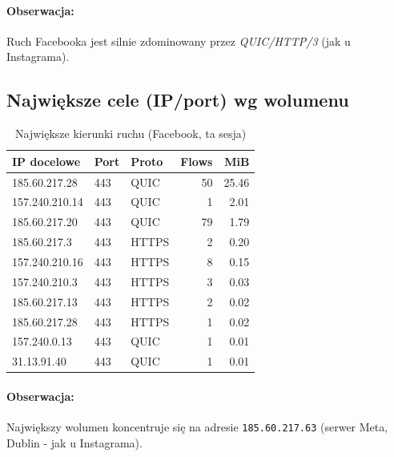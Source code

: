 \paragraph{Obserwacja:} 
Ruch Facebooka jest silnie zdominowany przez \emph{QUIC/HTTP/3} (jak u Instagrama). 

\subsection{Największe cele (IP/port) wg wolumenu}
\begin{table}[H]
  \centering
  \caption{Największe kierunki ruchu (Facebook, ta sesja)}
  \label{tab:fb-topdst}
  \begin{tabular}{lllrr}
    \toprule
    \textbf{IP docelowe} & \textbf{Port} & \textbf{Proto} & \textbf{Flows} & \textbf{MiB} \\
    \midrule
    185.60.217.28  & 443 & QUIC  & 50 & 25.46 \\
    157.240.210.14 & 443 & QUIC  & 1  & 2.01 \\
    185.60.217.20  & 443 & QUIC  & 79 & 1.79 \\
    185.60.217.3   & 443 & HTTPS & 2  & 0.20 \\
    157.240.210.16 & 443 & HTTPS & 8  & 0.15 \\
    157.240.210.3  & 443 & HTTPS & 3  & 0.03 \\
    185.60.217.13  & 443 & HTTPS & 2  & 0.02 \\
    185.60.217.28  & 443 & HTTPS & 1  & 0.02 \\
    157.240.0.13   & 443 & QUIC  & 1  & 0.01 \\
    31.13.91.40    & 443 & QUIC  & 1  & 0.01 \\
    \bottomrule
  \end{tabular}
\end{table}

\paragraph{Obserwacja:}
Największy wolumen koncentruje się na adresie \texttt{185.60.217.63} (serwer Meta, Dublin - jak u Instagrama).

